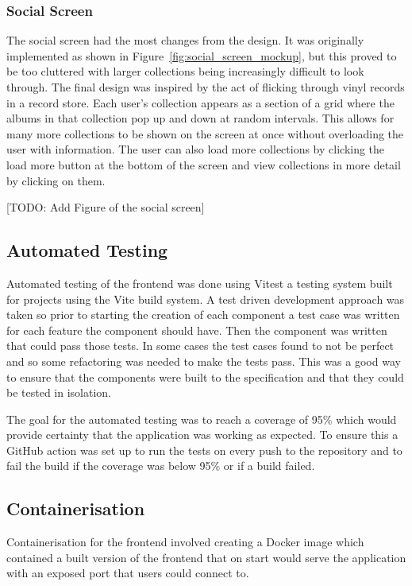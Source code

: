 \subsubsection{Social Screen}
The social screen had the most changes from the design. It was originally implemented as shown in Figure~\ref{fig:social_screen_mockup}, but this proved to be too cluttered with larger collections being increasingly difficult to look through. The final design was inspired by the act of flicking through vinyl records in a record store. Each user's collection appears as a section of a grid where the albums in that collection pop up and down at random intervals. This allows for many more collections to be shown on the screen at once without overloading the user with information. The user can also load more collections by clicking the load more button at the bottom of the screen and view collections in more detail by clicking on them.

[TODO: Add Figure of the social screen]

\subsection{Automated Testing}
Automated testing of the frontend was done using Vitest a testing system built for projects using the Vite build system. A test driven development approach was taken so prior to starting the creation of each component a test case was written for each feature the component should have. Then the component was written that could pass those tests. In some cases the test cases found to not be perfect and so some refactoring was needed to make the tests pass. This was a good way to ensure that the components were built to the specification and that they could be tested in isolation.

The goal for the automated testing was to reach a coverage of 95\% which would provide certainty that the application was working as expected. To ensure this a GitHub action was set up to run the tests on every push to the repository and to fail the build if the coverage was below 95\% or if a build failed.

\subsection{Containerisation}
Containerisation for the frontend involved creating a Docker image which contained a built version of the frontend that on start would serve the application with an exposed port that users could connect to.

